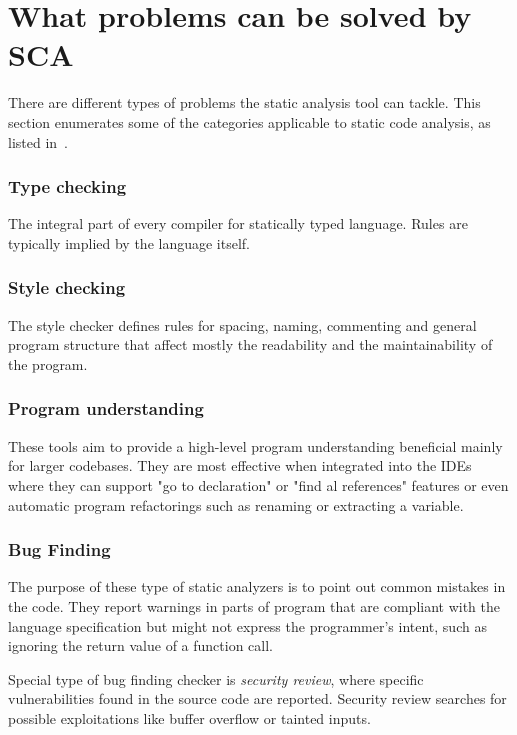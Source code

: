 \documentclass[
  digital, %
  table,   %
  lof,     %
  lot,     %
  oneside,
]{fithesis3}
\begin{document}
\section{What problems can be solved by SCA}
There are different types of problems the static analysis tool can tackle. This section enumerates some of the categories applicable to static code analysis, as listed in~\cite{secure-programming-sca}.

\subsubsection{Type checking}
The integral part of every compiler for statically typed language. Rules are typically implied by the language itself.

\subsubsection{Style checking}
The style checker defines rules for spacing, naming, commenting and general program structure that affect mostly the readability and the maintainability of the program. 

\subsubsection{Program understanding}
These tools aim to provide a high-level program understanding beneficial mainly for larger codebases. They are most effective when integrated into the IDEs where they can support "go to declaration" or "find al references" features or even automatic program refactorings such as renaming or extracting a variable.

\subsubsection{Bug Finding}
The  purpose of these type of static analyzers is to point out common mistakes in the code. They report warnings in parts of program that are compliant with the language specification but might not express the programmer's intent, such as ignoring the return value of a function call.

Special type of bug finding checker is \textit{security review}, where specific vulnerabilities found in the source code are reported. Security review searches for possible exploitations like buffer overflow or tainted inputs.
  
\end{document}
